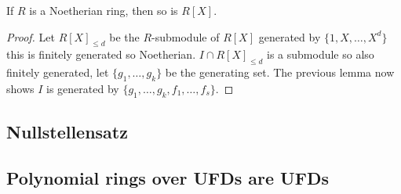 \documentclass{article}
\begin{document}
\begin{theorem}
    If $R$ is a Noetherian ring, then so is $R[X]$.
    \begin{proof}
        Let $R[X]_{\leq d}$ be the $R$-submodule of $R[X]$ generated by $\{1,X,\ldots,X^d\}$ this is finitely generated so Noetherian. $I\cap R[X]_{\leq d}$ is a submodule so also finitely generated, let $\{g_1,\ldots,g_k\}$ be the generating set. The previous lemma now shows $I$ is generated by $\{g_1,\ldots,g_k,f_1,\ldots,f_s\}$.
    \end{proof}
\end{theorem}

\subsection{Nullstellensatz}

\subsection{Polynomial rings over UFDs are UFDs}
\end{document}
